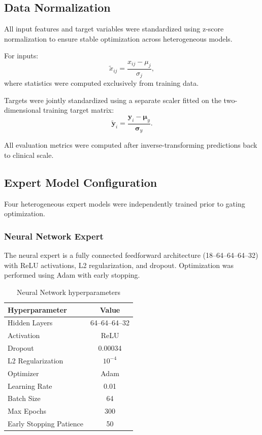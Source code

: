 \documentclass{customIEEEsingle}
\begin{document}
	\subsection{Data Normalization}
	
	All input features and target variables were standardized using z-score normalization to ensure stable optimization across heterogeneous models.
	
	For inputs:
	\[
	\tilde{x}_{ij} = \frac{x_{ij} - \mu_j}{\sigma_j},
	\]
	where statistics were computed exclusively from training data.
	
	Targets were jointly standardized using a separate scaler fitted on the two-dimensional training target matrix:
	\[
	\tilde{\mathbf{y}}_i =
	\frac{\mathbf{y}_i - \boldsymbol{\mu}_y}{\boldsymbol{\sigma}_y}.
	\]
	
	All evaluation metrics were computed after inverse-transforming predictions back to clinical scale.
	
	\subsection{Expert Model Configuration}
	
	Four heterogeneous expert models were independently trained prior to gating optimization.
	
	\subsubsection{Neural Network Expert}
	
	The neural expert is a fully connected feedforward architecture (18–64–64–64–32) with ReLU activations, L2 regularization, and dropout. Optimization was performed using Adam with early stopping.
	
	\begin{table}[htbp]
		\centering
		\caption{Neural Network hyperparameters}
		\label{tab:nn_params}
		\begin{tabular}{|l|c|}
			\hline
			Hyperparameter & Value \\
			\hline
			Hidden Layers & 64–64–64–32 \\
			Activation & ReLU \\
			Dropout & 0.00034 \\
			L2 Regularization & $10^{-4}$ \\
			Optimizer & Adam \\
			Learning Rate & 0.01 \\
			Batch Size & 64 \\
			Max Epochs & 300 \\
			Early Stopping Patience & 50 \\
			\hline
		\end{tabular}
	\end{table}
	
\end{document}
